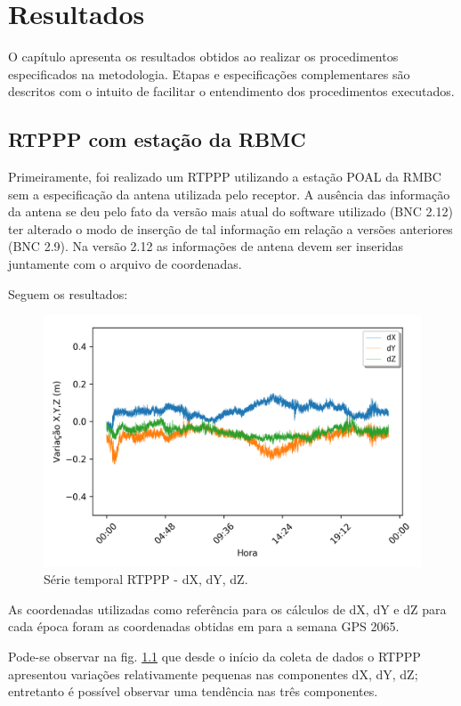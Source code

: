 \chapter{Resultados}
O capítulo apresenta os resultados obtidos ao realizar os procedimentos especificados na metodologia. Etapas e especificações complementares são descritos com o intuito de facilitar o entendimento dos procedimentos executados.

\section{RTPPP com estação da RBMC}

Primeiramente, foi realizado um RTPPP utilizando a estação POAL da RMBC sem a especificação da antena utilizada pelo receptor. A ausência das informação da antena se deu pelo fato da versão mais atual do software utilizado (BNC 2.12) ter alterado o modo de inserção de tal informação em relação a versões anteriores (BNC 2.9). Na versão 2.12 as informações de antena devem ser inseridas juntamente com o arquivo de coordenadas.

Seguem os resultados:

\begin{figure}[H]
\centering
\includegraphics[scale=0.9]{data/Graphics/POAL20636/POAL20636_graphic_xyz.png}
\caption{Série temporal RTPPP - dX, dY, dZ.}
\label{rtppp1}
\end{figure}

As coordenadas utilizadas como referência para os cálculos de dX, dY e dZ para cada época foram as coordenadas obtidas em \cite{sirgascon} para a semana GPS 2065.

Pode-se observar na fig. \ref{rtppp1} que desde o início da coleta de dados o RTPPP apresentou variações relativamente pequenas nas componentes dX, dY, dZ; entretanto é possível observar uma tendência nas três componentes.

